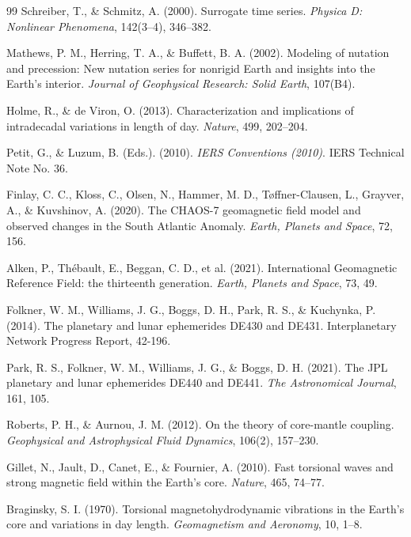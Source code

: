 \documentclass[twocolumn,9pt]{revtex4-2}
\begin{document}
\begin{thebibliography}{99}
Schreiber, T., \& Schmitz, A. (2000).
Surrogate time series.
\textit{Physica D: Nonlinear Phenomena}, 142(3--4), 346--382.

Mathews, P. M., Herring, T. A., \& Buffett, B. A. (2002).
Modeling of nutation and precession: New nutation series for nonrigid Earth and insights into the Earth's interior.
\textit{Journal of Geophysical Research: Solid Earth}, 107(B4).

Holme, R., \& de Viron, O. (2013).
Characterization and implications of intradecadal variations in length of day.
\textit{Nature}, 499, 202--204.

Petit, G., \& Luzum, B. (Eds.). (2010).
\textit{IERS Conventions (2010)}.
IERS Technical Note No. 36.

Finlay, C. C., Kloss, C., Olsen, N., Hammer, M. D., T\o{}ffner-Clausen, L., Grayver, A., \& Kuvshinov, A. (2020).
The CHAOS-7 geomagnetic field model and observed changes in the South Atlantic Anomaly.
\textit{Earth, Planets and Space}, 72, 156.

Alken, P., Th\'ebault, E., Beggan, C. D., et al. (2021).
International Geomagnetic Reference Field: the thirteenth generation.
\textit{Earth, Planets and Space}, 73, 49.

Folkner, W. M., Williams, J. G., Boggs, D. H., Park, R. S., \& Kuchynka, P. (2014).
The planetary and lunar ephemerides DE430 and DE431.
Interplanetary Network Progress Report, 42-196.

Park, R. S., Folkner, W. M., Williams, J. G., \& Boggs, D. H. (2021).
The JPL planetary and lunar ephemerides DE440 and DE441.
\textit{The Astronomical Journal}, 161, 105.

Roberts, P. H., \& Aurnou, J. M. (2012).
On the theory of core-mantle coupling.
\textit{Geophysical and Astrophysical Fluid Dynamics}, 106(2), 157--230.

Gillet, N., Jault, D., Canet, E., \& Fournier, A. (2010).
Fast torsional waves and strong magnetic field within the Earth's core.
\textit{Nature}, 465, 74--77.

Braginsky, S. I. (1970).
Torsional magnetohydrodynamic vibrations in the Earth's core and variations in day length.
\textit{Geomagnetism and Aeronomy}, 10, 1--8.


\end{thebibliography}
\end{document}
